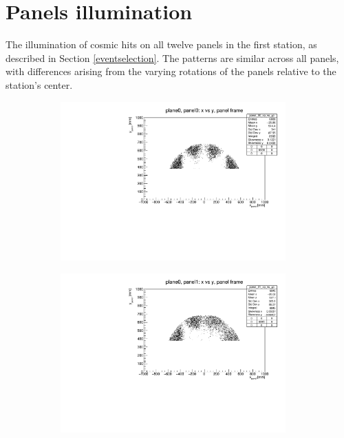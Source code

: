 \chapter{Panels illumination}\label{appendix2}
The illumination of cosmic hits on all twelve panels in the first station, as described in Section \ref{eventselection}. 
The patterns are similar across all panels, with differences arising from the varying rotations of the panels relative to the station's center.
\begin{figure}[!h]
    \centering
    \begin{subfigure}[b]{0.4\textwidth}
        \centering
        \includegraphics[width=0.95\textwidth]{figures/pdf/plane0_panel0_x_vs_y_all.pdf}
        \label{fig:panel0plane0}
    \end{subfigure}
    \hfill
    \begin{subfigure}[b]{0.4\textwidth}
        \centering
        \includegraphics[width=0.95\textwidth]{figures/pdf/plane0_panel1_x_vs_y_all.pdf}

\end{subfigure}
\end{figure}
